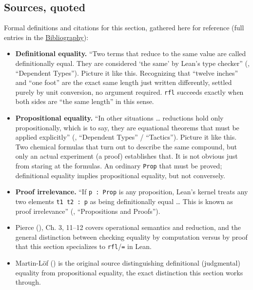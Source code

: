 \subsection{Sources, quoted}\label{sec:05-rigor-check:04-defeq-vs-propeq:7}

Formal definitions and citations for this section, gathered here for reference (full entries in the \hyperref[sec:root:bibliography:1]{Bibliography}):

\begin{itemize}
\tightlist
\item
  \textbf{Definitional equality.} ``Two terms that reduce to the same value are called definitionally equal. They are considered `the same' by Lean's type checker'' (\cite{TPIL4}, ``Dependent Types''). Picture it like this. Recognizing that ``twelve inches'' and ``one foot'' are the exact same length just written differently, settled purely by unit conversion, no argument required. \texttt{rfl} succeeds exactly when both sides are ``the same length'' in this sense.
\item
  \textbf{Propositional equality.} ``In other situations \ldots{} reductions hold only propositionally, which is to say, they are equational theorems that must be applied explicitly'' (\cite{TPIL4}, ``Dependent Types'' / ``Tactics''). Picture it like this. Two chemical formulas that turn out to describe the same compound, but only an actual experiment (a proof) establishes that. It is not obvious just from staring at the formulas. An ordinary \texttt{Prop} that must be proved; definitional equality implies propositional equality, but not conversely.
\item
  \textbf{Proof irrelevance.} ``If \texttt{p : Prop} is any proposition, Lean's kernel treats any two elements \texttt{t1 t2 : p} as being definitionally equal \ldots{} This is known as proof irrelevance'' (\cite{TPIL4}, ``Propositions and Proofs'').
\item
  Pierce (\cite{Pierce2002}), Ch. 3, 11--12 covers operational semantics and reduction, and the general distinction between checking equality by computation versus by proof that this section specializes to \texttt{rfl}/\texttt{=} in Lean.
\item
  Martin-Löf (\cite{MartinLof1984}) is the original source distinguishing definitional (judgmental) equality from propositional equality, the exact distinction this section works through.
\end{itemize}
